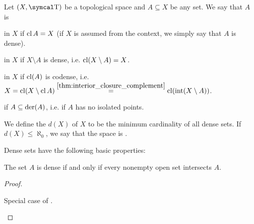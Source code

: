 \begin{definition}\label{def:topologically_dense_set}\cite[25]{Engelking1989}
  Let \( (X, \CT) \) be a topological space and \( A \subseteq X \) be any set. We say that \( A \) is

  \begin{defenum}
      in \( X \) if \( \operatorname{cl}{A} = X \) (if \( X \) is assumed from the context, we simply say that \( A \) is dense).

      in \( X \) if \( X \setminus A \) is dense, i.e. \( \operatorname{cl}(X \setminus A) = X \).

      in \( X \) if \( \operatorname{cl}(A) \) is codense, i.e. \( X = \operatorname{cl}(X \setminus \operatorname{cl} A) \overset {\ref{thm:interior_closure_complement}} = \operatorname{cl}(\operatorname{int}(X \setminus A)) \).

      if \( A \subseteq \operatorname{der}(A) \), i.e. if \( A \) has no isolated points.
  \end{defenum}

  We define the  \( d(X) \) of \( X \) to be the minimum cardinality of all dense sets. If \( d(X) \leq \aleph_0 \), we say that the space is .
\end{definition}

\begin{proposition}\label{thm:dense_set_properties}
  Dense sets have the following basic properties:
  \begin{propenum}
    \cite[proposition 1.3.5]{Engelking1989} The set \( A \) is dense if and only if every nonempty open set intersects \( A \).
  \end{propenum}
\end{proposition}
\begin{proof}\mbox{}
  \begin{description}
     Special case of .
  \end{description}
\end{proof}

